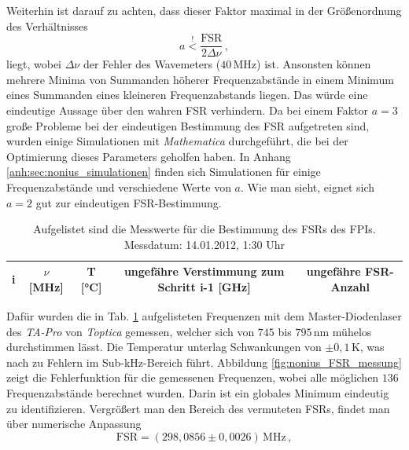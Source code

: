 Weiterhin ist darauf zu achten, dass dieser Faktor maximal in der Größenordnung
des Verhältnisses
\begin{equation}\label{eq:nonius_faktor}
	a\stackrel{!}{<}\frac{\text{FSR}}{2\Delta\nu}\,,
\end{equation}
liegt, wobei $\Delta\nu$ der Fehler des Wavemeters ($40\,$MHz) ist. Ansonsten
können mehrere Minima von Summanden höherer Frequenzabstände in einem Minimum
eines Summanden eines kleineren Frequenzabstands liegen. Das würde eine
eindeutige Aussage über den wahren FSR verhindern. Da bei
einem Faktor $a=3$ große Probleme bei der eindeutigen Bestimmung des FSR
aufgetreten sind, wurden einige Simulationen mit \textit{Mathematica}
durchgeführt, die bei der Optimierung dieses Parameters geholfen haben.
In Anhang \ref{anh:sec:nonius_simulationen} finden sich Simulationen für einige
Frequenzabstände und verschiedene Werte von $a$. Wie man sieht, eignet sich
$a=2$ gut zur eindeutigen FSR-Bestimmung.\par
\begin{table}[h]
	\begin{tabular}{ccccc}
		\toprule
		\multicolumn{1}{C{0.05\textwidth}}{i} &
		\multicolumn{1}{C{0.15\textwidth}}{$\nu$ [MHz]} &
		\multicolumn{1}{C{0.10\textwidth}}{T [°C]} &
		\multicolumn{1}{C{0.25\textwidth}}{ungefähre Verstimmung zum
		Schritt i-1 [GHz]} &
		\multicolumn{1}{C{0.23\textwidth}}{ungefähre FSR-Anzahl}\\
		\midrule[1px]
		\hline
		
		\bottomrule[1px]
	\end{tabular}
	\caption[FSR Messung]{Aufgelistet sind die Messwerte für die Bestimmung des
	FSRs des FPIs. Messdatum: 14.01.2012, 1:30 Uhr}
	\label{tab:nonius_FSR_messung}
\end{table}
Dafür wurden die in Tab. \ref{tab:nonius_FSR_messung} aufgelisteten Frequenzen
mit dem Master-Diodenlaser des \textit{TA-Pro} von \textit{Toptica} gemessen,
welcher sich von $745$ bis $795\,$nm mühelos durchstimmen lässt.
Die Temperatur unterlag Schwankungen von $\pm0,1\,$K, was nach
\cite{kuschnick:2000:diplomarbeit} zu Fehlern im Sub-kHz-Bereich führt.
Abbildung \ref{fig:nonius_FSR_messung} zeigt die Fehlerfunktion für die
gemessenen Frequenzen, wobei alle möglichen $136$ Frequenzabstände berechnet
wurden. Darin ist ein globales Minimum eindeutig zu identifizieren.
Vergrößert man den Bereich des vermuteten FSRs, findet man über numerische
Anpassung
\begin{equation}\label{eq:FSR_messung}
	\text{FSR}=(298,0856\pm0,0026)\,\text{MHz}\,,
\end{equation}
